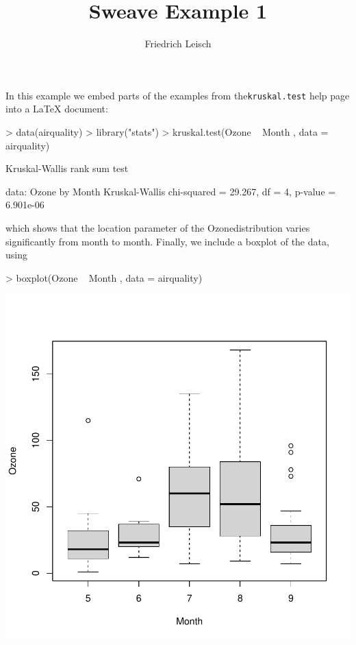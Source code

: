 \documentclass[a4paper]{article}
\title{Sweave  Example  1}
\author{Friedrich  Leisch}
\begin{document}


\maketitle

In this  example  we embed  parts of the  examples  from  the\texttt{kruskal.test} help  page  into a \LaTeX{}  document:
\begin{Schunk}
\begin{Sinput}
> data(airquality)
> library("stats")
> kruskal.test(Ozone ~ Month , data = airquality)
\end{Sinput}
\begin{Soutput}
	Kruskal-Wallis rank sum test

data:  Ozone by Month
Kruskal-Wallis chi-squared = 29.267, df = 4, p-value = 6.901e-06
\end{Soutput}
\end{Schunk}
which  shows  that  the  location  parameter  of the  Ozonedistribution  varies  significantly  from  month to month. Finally, we include a boxplot  of the data, using
\begin{Schunk}
\begin{Sinput}
> boxplot(Ozone ~ Month , data = airquality)
\end{Sinput}
\end{Schunk}

\begin{center}
\includegraphics{test-003}
  
\end{center}
\end{document}
